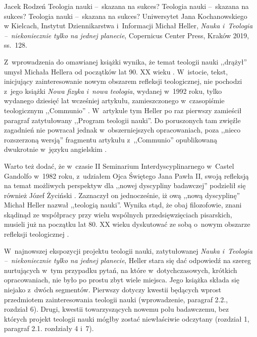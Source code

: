\begin{newrevplenv}{Jacek Rodzeń}
	{Teologia nauki --~skazana na sukces?}
	{Teologia nauki --~skazana na sukces?}
	{Teologia nauki --~skazana na sukces?}
	{Uniwersytet Jana Kochanowskiego w Kielcach, Instytut Dziennikarstwa i~Informacji}
	{Michał Heller, \textit{Nauka i~Teologia --~niekoniecznie tylko na jednej planecie}, Copernicus Center Press, Kraków 2019, ss.~128.\label{rodzen_anfang}}





\lettrine[loversize=0.13,lines=2,lraise=-0.03,nindent=0em,findent=0.2pt]%
{Z}{}~wprowadzenia do omawianej książki wynika, że temat teologii nauki ,,drążył'' umysł Michała Hellera od początków lat 90. XX wieku
\parencite[][s.~8]{heller_nauka_2019}. %
 W~istocie, tekst, inicjujący zainteresowanie nowym obszarem refleksji teologicznej, nie pochodzi z~jego książki \textit{Nowa fizyka i~nowa teologia}, wydanej w~1992 roku, tylko wydanego dziesięć lat wcześniej artykułu, zamieszczonego w~czasopiśmie teologicznym ,,Communio'' 
\parencite[][]{heller_stworzenie_1982}. %
 W~artykule tym Heller po raz pierwszy zamieścił paragraf zatytułowany ,,Program teologii nauki''. Do poruszonych tam zwięźle zagadnień nie powracał jednak w~obszerniejszych opracowaniach, poza ,,nieco rozszerzoną wersją'' 
\parencite[][s.~8]{heller_nauka_2019} %
 fragmentu artykułu z~,,Communio'' opublikowaną dwukrotnie w~języku angielskim 
\parencite[][]{heller_program_2003}.%


Warto też dodać, że w~czasie II Seminarium Interdyscyplinarnego w~Castel Gandolfo w~1982 roku, z~udziałem Ojca Świętego Jana Pawła II, swoją refleksją na temat możliwych perspektyw dla ,,nowej dyscypliny badawczej'' podzielił się również Józef Życiński
\parencite*[][]{zycinski_w_1984}. %
 Zaznaczył on jednocześnie, iż ową ,,nową dyscyplinę'' Michał Heller nazwał ,,teologią nauki''. Wynika stąd, że obaj filozofowie, znani skądinąd ze współpracy przy wielu wspólnych przedsięwzięciach pisarskich, musieli już na początku lat 80. XX wieku dyskutować ze sobą o~nowym obszarze refleksji teologicznej 
\parencite[więcej na ten temat zob.][]{polak_teologia_2015}.%


W~najnowszej ekspozycji projektu teologii nauki, zatytułowanej \textit{Nauka i~Teologia --~niekoniecznie tylko na jednej planecie}, Heller stara się dać odpowiedź na szereg nurtujących w~tym przypadku pytań, na które w~dotychczasowych, krótkich opracowaniach, nie było po prostu zbyt wiele miejsca. Jego książka składa się niejako z~dwóch segmentów. Pierwszy dotyczy kwestii będących wprost przedmiotem zainteresowania teologii nauki (wprowadzenie, paragraf 2.2., rozdział 6). Drugi, kwestii towarzyszących nowemu polu badawczemu, bez których projekt teologii nauki mógłby zostać niewłaściwie odczytany (rozdział 1, paragraf 2.1. rozdziały 4 i~7).


\end{newrevplenv}
